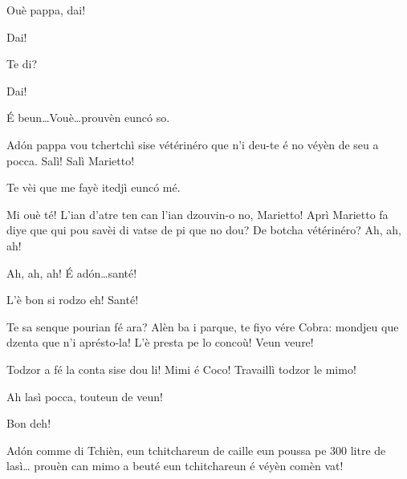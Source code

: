 \begin{drama}
\Simonspeaks Ouè pappa, dai!

\Mariettospeaks {} Dai!

\Cienspeaks Te di?

\Mariettospeaks {} Dai!

\Cienspeaks \'E beun\ldots Vouè\ldots prouvèn eunc\'o so.

\Simonspeaks Ad\'on pappa vou tchertchì sise vétérinéro que n’i deu-te é no véyèn de seu a pocca. Salì! Salì Marietto!


\Mariettospeaks Te vèi que me fayè itedjì eunc\'o mé.

\Cienspeaks Mi ouè té! L’ian d’atre ten can l'ian dzouvin-o no, Marietto! Aprì Marietto fa diye que qui pou savèi di vatse de pi que no dou? De botcha vétérinéro? Ah, ah, ah!

\Mariettospeaks Ah, ah, ah! \'E ad\'on\ldots santé! 


\Cienspeaks L'è bon si rodzo eh! Santé!


\Cienspeaks Te sa senque pourian fé ara? Alèn ba i parque, te fiyo vére Cobra: mondjeu que dzenta que n'i aprésto-la! L'è presta pe lo concoù! Veun veure!


\Sahlammspeaks {} Todzor a fé la conta sise dou li! Mimi é Coco! Travaillì todzor le mimo!


\Sahlammspeaks Ah lasì pocca, touteun de veun!


\Sahlammspeaks Bon deh!


\Sahlammspeaks Ad\'on comme di Tchièn, eun tchitchareun de caille eun poussa pe 300 litre de lasì\ldots {} prouèn can mimo a beuté eun tchitchareun é véyèn comèn vat!



\end{drama}
